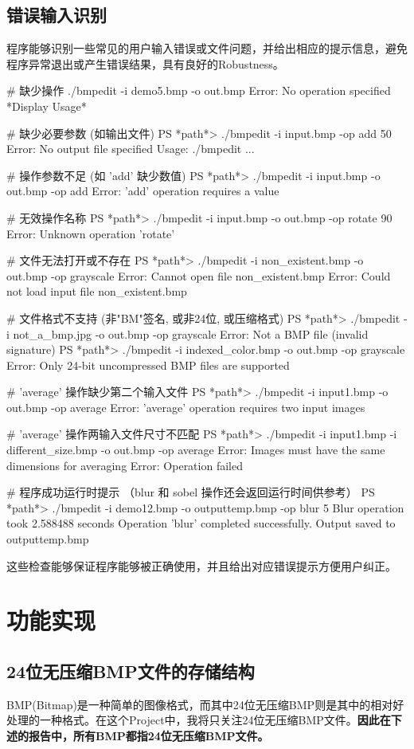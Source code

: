 \documentclass[11pt]{article}
\begin{document}
\subsection{错误输入识别}
程序能够识别一些常见的用户输入错误或文件问题，并给出相应的提示信息，避免程序异常退出或产生错误结果，具有良好的Robustness。
\begin{commandline}
# 缺少操作
./bmpedit -i demo5.bmp -o out.bmp            
Error: No operation specified
*Display Usage*
  
# 缺少必要参数 (如输出文件)
PS *path*> ./bmpedit -i input.bmp -op add 50
Error: No output file specified
Usage: ./bmpedit ...

# 操作参数不足 (如 'add' 缺少数值)
PS *path*> ./bmpedit -i input.bmp -o out.bmp -op add
Error: 'add' operation requires a value

# 无效操作名称
PS *path*> ./bmpedit -i input.bmp -o out.bmp -op rotate 90
Error: Unknown operation 'rotate'

# 文件无法打开或不存在
PS *path*> ./bmpedit -i non_existent.bmp -o out.bmp -op grayscale
Error: Cannot open file non_existent.bmp
Error: Could not load input file non_existent.bmp

# 文件格式不支持 (非"BM"签名, 或非24位, 或压缩格式)
PS *path*> ./bmpedit -i not_a_bmp.jpg -o out.bmp -op grayscale
Error: Not a BMP file (invalid signature)
PS *path*> ./bmpedit -i indexed_color.bmp -o out.bmp -op grayscale
Error: Only 24-bit uncompressed BMP files are supported

# 'average' 操作缺少第二个输入文件
PS *path*> ./bmpedit -i input1.bmp -o out.bmp -op average
Error: 'average' operation requires two input images

# 'average' 操作两输入文件尺寸不匹配
PS *path*> ./bmpedit -i input1.bmp -i different_size.bmp -o out.bmp -op average
Error: Images must have the same dimensions for averaging
Error: Operation failed

# 程序成功运行时提示 （blur 和 sobel 操作还会返回运行时间供参考）
PS *path*> ./bmpedit -i demo12.bmp -o outputtemp.bmp -op blur 5   
Blur operation took 2.588488 seconds
Operation 'blur' completed successfully. Output saved to outputtemp.bmp
\end{commandline}
这些检查能够保证程序能够被正确使用，并且给出对应错误提示方便用户纠正。

\section{功能实现}
\subsection{24位无压缩BMP文件的存储结构}
BMP(Bitmap)是一种简单的图像格式，而其中24位无压缩BMP则是其中的相对好处理的一种格式。在这个Project中，我将只关注24位无压缩BMP文件。\textbf{因此在下述的报告中，所有BMP都指24位无压缩BMP文件。}
\end{document}
